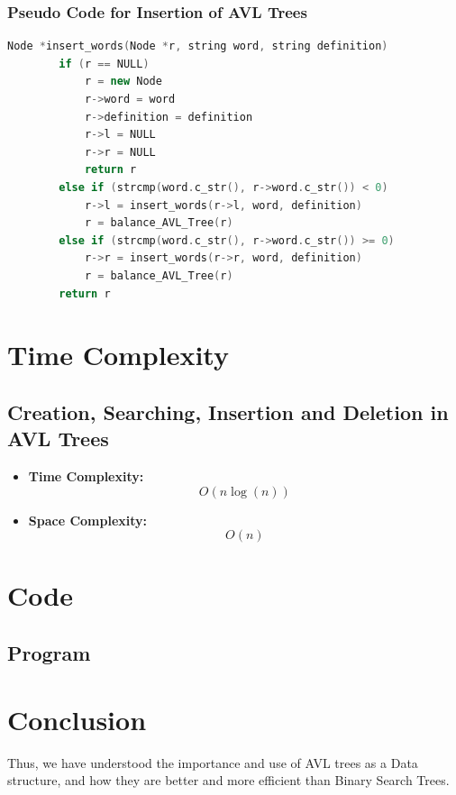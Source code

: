 \documentclass[11pt]{article}
\begin{document}
\subsubsection*{Pseudo Code for Insertion of AVL Trees}
\begin{lstlisting}[language=C++]
	Node *insert_words(Node *r, string word, string definition)
		if (r == NULL)
			r = new Node
			r->word = word
			r->definition = definition
			r->l = NULL
			r->r = NULL
			return r
		else if (strcmp(word.c_str(), r->word.c_str()) < 0)
			r->l = insert_words(r->l, word, definition)
			r = balance_AVL_Tree(r)
		else if (strcmp(word.c_str(), r->word.c_str()) >= 0)
			r->r = insert_words(r->r, word, definition)
			r = balance_AVL_Tree(r)
		return r
\end{lstlisting}


\section{Time Complexity}

\subsection{Creation, Searching, Insertion and Deletion in AVL Trees}
\begin{itemize}
    \item \textbf{Time Complexity:} \[ O(n\log(n))\]
    \item \textbf{Space Complexity:} \[ O(n) \]
\end{itemize}

\section{Code}

\subsection{Program}




\section{Conclusion}
Thus, we have understood the importance and use of AVL trees as a Data structure, and how they are better and more efficient than Binary Search Trees.

\clearpage
\end{document}
